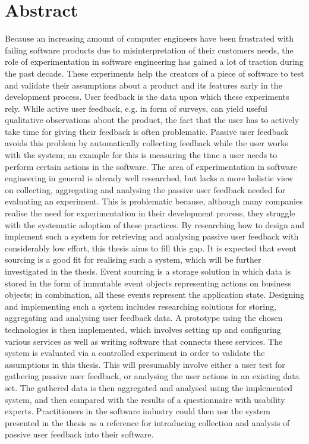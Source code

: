 %
\chapter*{Abstract}
\label{sec:abstract}
\vspace*{-10mm}

Because an increasing amount of computer engineers have been frustrated with failing software products due to misinterpretation of their customers needs, the role of experimentation in software engineering has gained a lot of traction during the past decade.
These experiments help the creators of a piece of software to test and validate their assumptions about a product and its features early in the development process.
User feedback is the data upon which these experiments rely.
While active user feedback, e.g. in form of surveys, can yield useful qualitative observations about the product, the fact that the user has to actively take time for giving their feedback is often problematic.
Passive user feedback avoids this problem by automatically collecting feedback while the user works with the system; an example for this is measuring the time a user needs to perform certain actions in the software.
The area of experimentation in software engineering in general is already well researched, but lacks a more holistic view on collecting, aggregating and analysing the passive user feedback needed for evaluating an experiment.
This is problematic because, although many companies realise the need for experimentation in their development process, they struggle with the systematic adoption of these practices.
By researching how to design and implement such a system for retrieving and analysing passive user feedback with considerably low effort, this thesis aims to fill this gap.
It is expected that event sourcing is a good fit for realising such a system, which will be further investigated in the thesis.
Event sourcing is a storage solution in which data is stored in the form of immutable event objects representing actions on business objects; in combination, all these events represent the application state.
Designing and implementing such a system includes researching solutions for storing, aggregating and analysing user feedback data.
A prototype using the chosen technologies is then implemented, which involves setting up and configuring various services as well as writing software that connects these services.
The system is evaluated via a controlled experiment in order to validate the assumptions in this thesis.
This will presumably involve either a user test for gathering passive user feedback, or analysing the user actions in an existing data set.
The gathered data is then aggregated and analysed using the implemented system, and then compared with the results of a questionnaire with usability experts.
Practitioners in the software industry could then use the system presented in the thesis as a reference for introducing collection and analysis of passive user feedback into their software.

